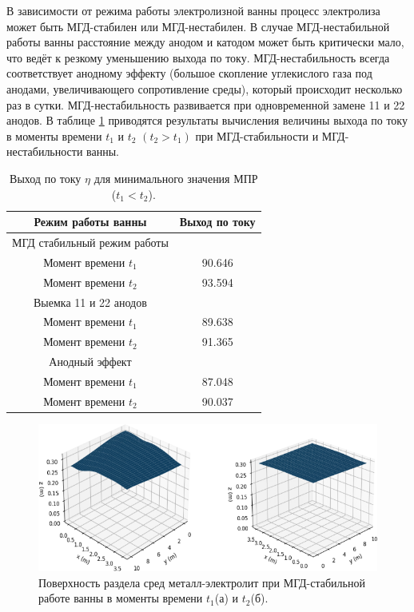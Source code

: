 \documentclass[]{pmi}
\begin{document}
В зависимости от режима работы электролизной ванны процесс электролиза может быть МГД-стабилен или МГД-нестабилен. В случае МГД-нестабильной работы ванны расстояние между анодом и катодом может быть критически мало, что ведёт к резкому уменьшению выхода по току. МГД-нестабильность всегда соответствует анодному эффекту (большое скопление углекислого газа под анодами, увеличивающего сопротивление среды), который происходит несколько раз в сутки. МГД-нестабильность развивается при одновременной замене 11 и 22 анодов. В таблице \ref{table:vihPoToku} приводятся результаты вычисления величины выхода по току в моменты времени $t_1$ и $t_2$ $(t_2>t_1)$ при МГД-стабильности и МГД-нестабильности ванны. 

\begin{table}[H]
\centering
\caption{Выход по току $\eta$ для минимального значения МПР ($t_1 < t_2$).} \label{table:vihPoToku}
\begin{tabular}{|c|c|}
\hline
Режим работы ванны &Выход по току	\\
\hline
МГД стабильный режим работы &	\\
Момент времени $t_1$			&90.646	\\ 
Момент времени $t_2$		&93.594	\\  
\hline
Выемка 11 и 22 анодов &	\\
Момент времени $t_1$		&89.638	\\  
Момент времени $t_2$		&91.365	\\  
\hline
Анодный эффект &	\\
Момент времени $t_1$	&87.048	\\  
Момент времени $t_2$	&90.037	\\  
\hline
\end{tabular}
\end{table}

\begin{figure}[H]
    \centering
    \includegraphics[width=150mm]{спокойная поверхность.png}
    \caption{Поверхность раздела сред металл-электролит при МГД-стабильной работе ванны в моменты времени $t_1$(а) и $t_2$(б).}
    \label{fig:stab} 
\end{figure}
\end{document}
